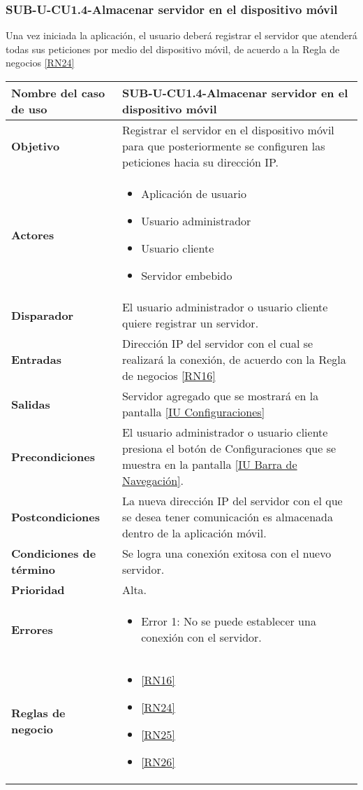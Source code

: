 \subsubsection{SUB-U-CU1.4-Almacenar servidor en el dispositivo móvil}\label{SUB-U-CU1.4}
Una vez iniciada la aplicación, el usuario deberá registrar el servidor que atenderá todas sus peticiones por medio del dispositivo móvil, de acuerdo a la Regla de negocios \ref{RN24}
\begin{longtable}{|J{5cm}|J{10.3cm}|}
	\hline
	\textbf{Nombre del caso de uso} &
		SUB-U-CU1.4-Almacenar servidor en el dispositivo móvil \\ \hline
	\textbf{Objetivo} &
		Registrar el servidor en el dispositivo móvil para que posteriormente se configuren las peticiones hacia su dirección IP. \\ \hline
	\textbf{Actores} &
	    \begin{itemize}
			\item Aplicación de usuario
			\item Usuario administrador
			\item Usuario cliente
		    \item Servidor embebido
		\end{itemize}\\ \hline 
	\textbf{Disparador} & 
		El usuario administrador o usuario cliente quiere registrar un servidor.\\ \hline 
	\textbf{Entradas} & 
		Dirección IP del servidor con el cual se realizará la conexión, de acuerdo con la Regla de negocios \ref{RN16}\\ \hline 
	\textbf{Salidas} & 
		Servidor agregado que se mostrará en la pantalla \hyperref[fig:Configuraciones]{[IU Configuraciones]} \\ \hline
	\textbf{Precondiciones} &
		El usuario administrador o usuario cliente presiona el botón de Configuraciones que se muestra en la pantalla \hyperref[fig:Barra de navegacion]{[IU Barra de Navegación]}.\\ \hline 
	\textbf{Postcondiciones} &
		La nueva dirección IP del servidor con el que se desea tener comunicación es almacenada dentro de la aplicación móvil.\\ \hline 
	\textbf{Condiciones de término} & 
		Se logra una conexión exitosa con el nuevo servidor. \\ \hline
	\textbf{Prioridad} & 
		Alta. \\ \hline
	\textbf{Errores} & 
		\begin{itemize}
			\item \label{SUB-U-CU1.4:Error1} Error 1: No se puede establecer una conexión con el servidor.
		\end{itemize} \\ \hline
	\textbf{Reglas de negocio} & 
	    \begin{itemize}
		    \item \ref{RN16}
		    \item \ref{RN24}
		    \item \ref{RN25}
		    \item \ref{RN26}
		\end{itemize} \\ \hline
\end{longtable}

